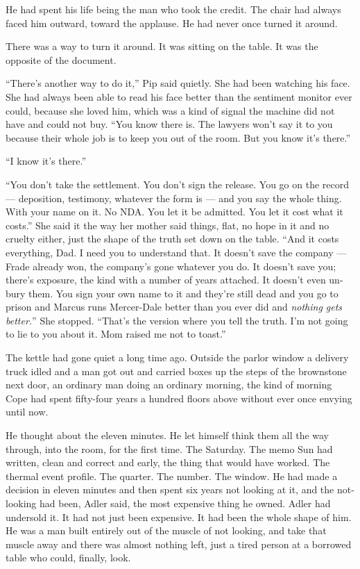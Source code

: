 \documentclass[11pt,openany]{book}
\newcommand{\scenebreak}{\par\vspace{0.5\baselineskip}\begin{center}\textasteriskcentered\quad\textasteriskcentered\quad\textasteriskcentered\end{center}\vspace{0.5\baselineskip}\par}
\begin{document}
He had spent his life being the man who took the credit. The chair had always faced him outward, toward the applause. He had never once turned it around.

There was a way to turn it around. It was sitting on the table. It was the opposite of the document.


\scenebreak


``There's another way to do it,'' Pip said quietly. She had been watching his face. She had always been able to read his face better than the sentiment monitor ever could, because she loved him, which was a kind of signal the machine did not have and could not buy. ``You know there is. The lawyers won't say it to you because their whole job is to keep you out of the room. But you know it's there.''

``I know it's there.''

``You don't take the settlement. You don't sign the release. You go on the record --- deposition, testimony, whatever the form is --- and you say the whole thing. With your name on it. No NDA. You let it be admitted. You let it cost what it costs.'' She said it the way her mother said things, flat, no hope in it and no cruelty either, just the shape of the truth set down on the table. ``And it costs everything, Dad. I need you to understand that. It doesn't save the company --- Frade already won, the company's gone whatever you do. It doesn't save you; there's exposure, the kind with a number of years attached. It doesn't even un-bury them. You sign your own name to it and they're still dead and you go to prison and Marcus runs Mercer-Dale better than you ever did and \textit{nothing gets better.}'' She stopped. ``That's the version where you tell the truth. I'm not going to lie to you about it. Mom raised me not to toast.''

The kettle had gone quiet a long time ago. Outside the parlor window a delivery truck idled and a man got out and carried boxes up the steps of the brownstone next door, an ordinary man doing an ordinary morning, the kind of morning Cope had spent fifty-four years a hundred floors above without ever once envying until now.

He thought about the eleven minutes. He let himself think them all the way through, into the room, for the first time. The Saturday. The memo Sun had written, clean and correct and early, the thing that would have worked. The thermal event profile. The quarter. The number. The window. He had made a decision in eleven minutes and then spent six years not looking at it, and the not-looking had been, Adler said, the most expensive thing he owned. Adler had undersold it. It had not just been expensive. It had been the whole shape of him. He was a man built entirely out of the muscle of not looking, and take that muscle away and there was almost nothing left, just a tired person at a borrowed table who could, finally, look.
\end{document}
